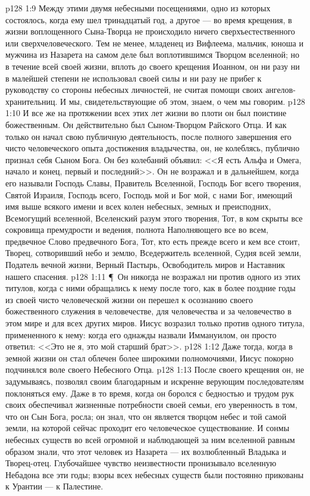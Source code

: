 \vs p128 1:9 Между этими двумя небесными посещениями, одно из которых состоялось, когда ему шел тринадцатый год, а другое --- во время крещения, в жизни воплощенного Сына\hyp{}Творца не происходило ничего сверхъестественного или сверхчеловеческого. Тем не менее, младенец из Вифлеема, мальчик, юноша и мужчина из Назарета на самом деле был воплотившимся Творцом вселенной; но в течение всей своей жизни, вплоть до своего крещения Иоанном, он ни разу ни в малейшей степени не использовал своей силы и ни разу не прибег к руководству со стороны небесных личностей, не считая помощи своих ангелов\hyp{}хранительниц. И мы, свидетельствующие об этом, знаем, о чем мы говорим.
\vs p128 1:10 И все же на протяжении всех этих лет жизни во плоти он был поистине божественным. Он действительно был Сыном\hyp{}Творцом Райского Отца. И как только он начал свою публичную деятельность, после полного завершения его чисто человеческого опыта достижения владычества, он, не колеблясь, публично признал себя Сыном Бога. Он без колебаний объявил: <<Я есть Альфа и Омега, начало и конец, первый и последний>>. Он не возражал и в дальнейшем, когда его называли Господь Славы, Правитель Вселенной, Господь Бог всего творения, Святой Израиля, Господь всего, Господь мой и Бог мой, с нами Бог, имеющий имя выше всякого имени и всех колен небесных, земных и преисподних, Всемогущий вселенной, Вселенский разум этого творения, Тот, в ком скрыты все сокровища премудрости и ведения, полнота Наполняющего все во всем, предвечное Слово предвечного Бога, Тот, кто есть прежде всего и кем все стоит, Творец, сотворивший небо и землю, Вседержитель вселенной, Судия всей земли, Податель вечной жизни, Верный Пастырь, Освободитель миров и Наставник нашего спасения.
\vs p128 1:11 \P\ Он никогда не возражал ни против одного из этих титулов, когда с ними обращались к нему после того, как в более поздние годы из своей чисто человеческой жизни он перешел к осознанию своего божественного служения в человечестве, для человечества и за человечество в этом мире и для всех других миров. Иисус возразил только против одного титула, примененного к нему: когда его однажды назвали Иммануилом, он просто ответил: <<Это не я, это мой старший брат>>.
\vs p128 1:12 Даже тогда, когда в земной жизни он стал облечен более широкими полномочиями, Иисус покорно подчинялся воле своего Небесного Отца.
\vs p128 1:13 После своего крещения он, не задумываясь, позволял своим благодарным и искренне верующим последователям поклоняться ему. Даже в то время, когда он боролся с бедностью и трудом рук своих обеспечивал жизненные потребности своей семьи, его уверенность в том, что он Сын Бога, росла; он знал, что он является творцом небес и той самой земли, на которой сейчас проходит его человеческое существование. И сонмы небесных существ во всей огромной и наблюдающей за ним вселенной равным образом знали, что этот человек из Назарета --- их возлюбленный Владыка и Творец\hyp{}отец. Глубочайшее чувство неизвестности пронизывало вселенную Небадона все эти годы; взоры всех небесных существ были постоянно прикованы к Урантии --- к Палестине.
